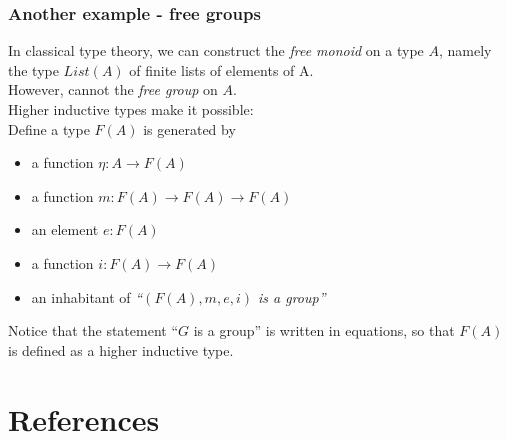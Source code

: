 \documentclass[dvipdfmx]{beamer}
\begin{document}
\begin{frame}
  \frametitle{Another example - free groups}
  In classical type theory,
  we can construct the {\it free monoid} on a type $A$,
  namely the type $List \left( A \right)$ of finite lists
  of elements of A.
  \\
  However, cannot the {\it free group} on $A$.
  \\
  Higher inductive types make it possible:
  \\
  Define a type $F \left( A \right)$ is generated by
  \begin{itemize}
    \item a function $\eta : A \to F \left( A \right)$
    \item a function $m : F \left( A \right) \to
      F \left( A \right) \to F \left( A \right)$
    \item an element $e : F \left( A \right)$
    \item a function $i : F \left( A \right) \to F \left( A \right)$
    \item an inhabitant of
      {\it ``$\left( F \left( A \right) , m , e , i \right)$ is a group''}
  \end{itemize}
  Notice that the statement ``$G$ is a group''
  is written in equations, so that
  $F \left( A \right)$ is defined as a higher inductive type.
\end{frame}

\section{References}



\end{document}
